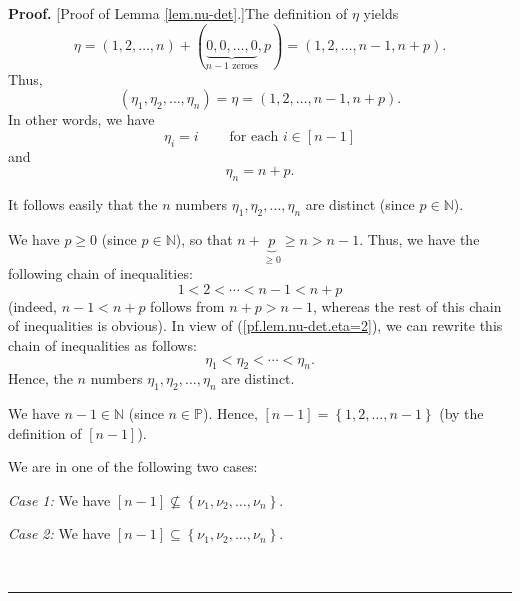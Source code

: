 \documentclass[numbers=enddot,12pt,final,onecolumn,notitlepage,english]{scrartcl}%
\theoremstyle{definition}
\newenvironment{proof}[1][Proof]{\noindent\textbf{#1.} }{\ \rule{0.5em}{0.5em}}
\newenvironment{verlong}{}{}
\newenvironment{vershort}{}{}
\begin{document}
\begin{proof}
[Proof of Lemma \ref{lem.nu-det}.]The definition of $\eta$ yields%
\begin{equation}
\eta=\left(  1,2,\ldots,n\right)  +\left(  \underbrace{0,0,\ldots
,0}_{n-1\text{ zeroes}},p\right)  =\left(  1,2,\ldots,n-1,n+p\right)
.\nonumber
\end{equation}
Thus,%
\begin{equation}
\left(  \eta_{1},\eta_{2},\ldots,\eta_{n}\right)  =\eta=\left(  1,2,\ldots
,n-1,n+p\right)  . \label{pf.lem.nu-det.eta=2}%
\end{equation}
In other words, we have%
\begin{equation}
\eta_{i}=i\ \ \ \ \ \ \ \ \ \ \text{for each }i\in\left[  n-1\right]
\label{pf.lem.nu-det.etai=}%
\end{equation}
and%
\begin{equation}
\eta_{n}=n+p. \label{pf.lem.nu-det.etan=}%
\end{equation}


\begin{vershort}
\noindent It follows easily that the $n$ numbers $\eta_{1},\eta_{2}%
,\ldots,\eta_{n}$ are distinct (since $p\in\mathbb{N}$).
\end{vershort}

\begin{verlong}
We have $p\geq0$ (since $p\in\mathbb{N}$), so that $n+\underbrace{p}_{\geq
0}\geq n>n-1$. Thus, we have the following chain of inequalities:%
\[
1<2<\cdots<n-1<n+p
\]
(indeed, $n-1<n+p$ follows from $n+p>n-1$, whereas the rest of this chain of
inequalities is obvious). In view of (\ref{pf.lem.nu-det.eta=2}), we can
rewrite this chain of inequalities as follows:
\[
\eta_{1}<\eta_{2}<\cdots<\eta_{n}.
\]
Hence, the $n$ numbers $\eta_{1},\eta_{2},\ldots,\eta_{n}$ are distinct.
\end{verlong}

\begin{verlong}
We have $n-1\in\mathbb{N}$ (since $n\in\mathbb{P}$). Hence, $\left[
n-1\right]  =\left\{  1,2,\ldots,n-1\right\}  $ (by the definition of $\left[
n-1\right]  $). \medskip
\end{verlong}

We are in one of the following two cases:

\textit{Case 1:} We have $\left[  n-1\right]  \not \subseteq \left\{  \nu
_{1},\nu_{2},\ldots,\nu_{n}\right\}  $.

\textit{Case 2:} We have $\left[  n-1\right]  \subseteq\left\{  \nu_{1}%
,\nu_{2},\ldots,\nu_{n}\right\}  $. \medskip


\end{proof}
\end{document}
